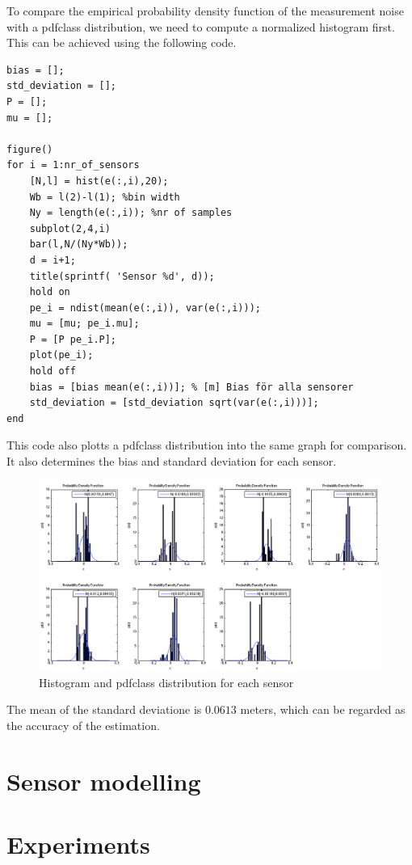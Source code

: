 \documentclass[10pt,a4paper]{report}
\begin{document}
To compare the empirical probability density function of the measurement noise with a pdfclass distribution, we need to compute a normalized histogram first. This can be achieved using the following code.
\begin{verbatim}
bias = [];
std_deviation = [];
P = [];
mu = [];

figure()
for i = 1:nr_of_sensors
    [N,l] = hist(e(:,i),20);
    Wb = l(2)-l(1); %bin width
    Ny = length(e(:,i)); %nr of samples
    subplot(2,4,i)
    bar(l,N/(Ny*Wb));
    d = i+1;
    title(sprintf( 'Sensor %d', d));
    hold on
    pe_i = ndist(mean(e(:,i)), var(e(:,i)));
    mu = [mu; pe_i.mu];
    P = [P pe_i.P];
    plot(pe_i);
    hold off
    bias = [bias mean(e(:,i))]; % [m] Bias för alla sensorer
    std_deviation = [std_deviation sqrt(var(e(:,i)))];
end
\end{verbatim}
This code also plotts a pdfclass distribution into the same graph for comparison. It also determines the bias and standard deviation for each sensor. 
\begin{figure}[H]
  \label{histogram}
  \includegraphics[width = 400pt]{histogram.png}
  \caption{Histogram and pdfclass distribution for each sensor}
\end{figure}
The mean of the standard deviatione is $0.0613$ meters, which can be regarded as the accuracy of the estimation.



\newpage
\section{Sensor modelling}
\label{Sensor modeling}

\newpage
\section{Experiments}
\label{Experiments}
\end{document}
